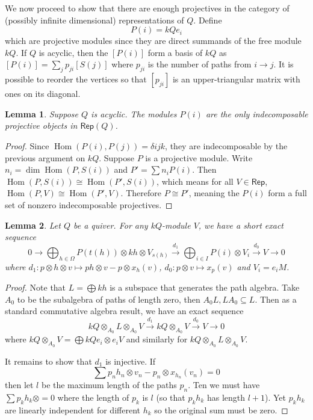 \documentclass[12pt]{report}
\newtheorem{lemma}{Lemma}[section]
\theoremstyle{remark}
\theoremstyle{definition}
\newcommand{\Hom}[0]{\operatorname{Hom}}
\newcommand{\Rep}[0]{\mathsf{Rep}}
\begin{document}
    We now proceed to show that there are enough projectives in the category of (possibly infinite dimensional) representations of $Q$. Define
    \[P(i)=kQe_i\]
    which are projective modules since they are direct summands of the free module $kQ$. If $Q$ is acyclic, then the $[P(i)]$ form a basis of $kQ$ as $[P(i)]=\sum_j p_{ji}[S(j)]$ where $p_{ji}$ is the number of paths from $i\to j$. It is possible to reorder the vertices so that $[p_{ji}]$ is an upper-triangular matrix with ones on its diagonal.
    \begin{lemma}
        Suppose $Q$ is acyclic. The modules $P(i)$ are the only indecomposable projective objects in $\Rep(Q)$.
    \end{lemma}
    \begin{proof}
        Since $\Hom(P(i), P(j))=\delta{ij}k$, they are indecomposable by the previous argument on $kQ$. Suppose $P$ is a projective module. Write $n_i=\dim\Hom(P, S(i))$ and $P'=\sum n_iP(i)$. Then $\Hom(P, S(i))\cong \Hom(P', S(i))$, which means for all $V\in\Rep$, $\Hom(P, V)\cong\Hom(P', V)$. Therefore $P\cong P'$, meaning the $P(i)$ form a full set of nonzero indecomposable projectives. 
    \end{proof}
    \begin{lemma}\label{lem-standard-resol}
        Let $Q$ be a quiver. For any $kQ$-module $V$, we have a short exact sequence
        \[0\to \bigoplus_{h\in\Omega}P(t(h))\otimes kh\otimes V_{s(h)}\xrightarrow{d_1}\bigoplus_{i\in I}P(i)\otimes V_i\xrightarrow{d_0}V\to 0\]
        where $d_1:p\otimes h\otimes v\mapsto ph\otimes v-p\otimes x_h(v)$, $d_0:p\otimes v\mapsto x_p(v)$ and $V_i=e_iM$.
    \end{lemma}
    \begin{proof}
        Note that $L=\bigoplus kh$ is a subspace that generates the path algebra. Take $A_0$ to be the subalgebra of paths of length zero, then $A_0L, LA_0\subseteq L$. Then as a standard commutative algebra result, we have an exact sequence
        \[kQ\otimes_{A_0}L\otimes_{A_0}V\xrightarrow{d_1} kQ\otimes_{A_0}V\xrightarrow{d_0}V\to 0\]
        where $kQ\otimes_{A_0}V=\bigoplus kQe_i\otimes e_iV$ and similarly for $kQ\otimes_{A_0}L\otimes_{A_0}V$.

        It remains to show that $d_1$ is injective. If
        \[\sum p_nh_n\otimes v_n-p_n\otimes x_{h_n}(v_n)=0\]
        then let $l$ be the maximum length of the paths $p_n$. Ten we must have $\sum p_kh_k\otimes=0$ where the length of $p_k$ is $l$ (so that $p_kh_k$ has length $l+1$). Yet $p_kh_k$ are linearly independent for different $h_k$ so the original sum must be zero.
    \end{proof}
\end{document}
